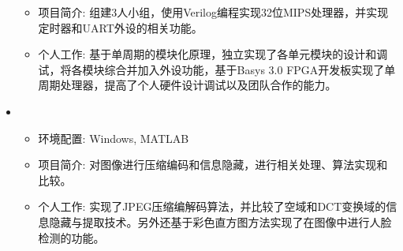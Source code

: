 \begin{itemize}[leftmargin=*]
{\begin{itemize}
      \item 项目简介: 组建3人小组，使用Verilog编程实现32位MIPS处理器，并实现定时器和UART外设的相关功能。
      \item 个人工作: 基于单周期的模块化原理，独立实现了各单元模块的设计和调试，将各模块综合并加入外设功能，基于Basys 3.0 FPGA开发板实现了单周期处理器，提高了个人硬件设计调试以及团队合作的能力。
    \end{itemize}
    }
    \item
    {\small
    \begin{itemize}
      \item 环境配置: Windows, MATLAB
      \item 项目简介: 对图像进行压缩编码和信息隐藏，进行相关处理、算法实现和比较。
      \item 个人工作: 实现了JPEG压缩编解码算法，并比较了空域和DCT变换域的信息隐藏与提取技术。另外还基于彩色直方图方法实现了在图像中进行人脸检测的功能。
    \end{itemize}
    }


  \end{itemize}